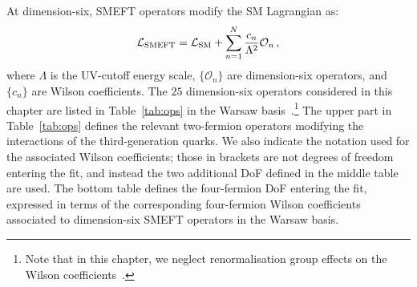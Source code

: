 \documentclass[withindex,glossary]{cam-thesis}
\begin{document}
At dimension-six, SMEFT operators modify the SM Lagrangian as:
\begin{equation}
    \label{eq:lagrangian}
    \mathcal{L}_{\rm SMEFT} = \mathcal{L}_{\rm SM} + \sum_{n=1}^{N} \frac{c_n}{\Lambda^2} \mathcal{O}_n \, ,
\end{equation}
%
where $\Lambda$ is the UV-cutoff energy scale, $\{\mathcal{O}_{n} \}$ are dimension-six operators, and
$\{ c_n \}$ are Wilson coefficients. The $25$ dimension-six operators considered in this chapter 
are listed in Table~\ref{tab:ops} in the Warsaw basis~\cite{Grzadkowski:2010es}.\footnote{Note that in this chapter, we neglect renormalisation group effects on the Wilson coefficients~\cite{Aoude:2022aro}. } 
The upper part in Table~\ref{tab:ops} defines the relevant two-fermion 
operators modifying the interactions of the third-generation
quarks.
%
We also indicate the notation used for the associated Wilson coefficients; those
in brackets are not degrees of freedom entering the fit,
and instead the two additional DoF defined in the middle table are used.
%
The bottom table defines the four-fermion DoF entering the fit,
expressed in terms of the corresponding four-fermion Wilson coefficients
associated to dimension-six SMEFT operators in the Warsaw basis.
\end{document}
